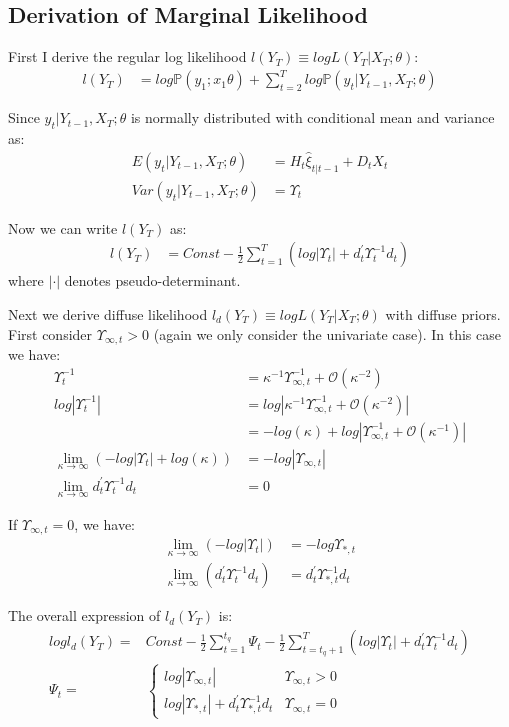 \documentclass[10pt]{article}
\numberwithin{equation}{section}
\begin{document}
\subsection{Derivation of Marginal Likelihood} \label{ap:NL}
First I derive the regular log likelihood $l(Y_T)\equiv logL(Y_T|X_T;\theta)$: 
\begin{align*}
    l(Y_T) &= log\mathbb{P}(y_1;x_1\theta) + \sum_{t=2}^Tlog\mathbb{P}(y_t|Y_{t-1},X_T;\theta)
\end{align*}

Since $y_t|Y_{t-1},X_T;\theta$ is normally distributed with conditional mean and variance as:
\begin{align*}
    E(y_t|Y_{t-1},X_T;\theta) &= H_t\hat{\xi}_{t|t-1} + D_tX_t \\
    Var(y_t|Y_{t-1},X_T;\theta) &= \Upsilon_t
\end{align*}

Now we can write $l(Y_T)$ as:
\begin{align*}
    l(Y_T) &= Const - \frac{1}{2}\sum_{t=1}^T(log|\Upsilon_t| + d_t^{'}\Upsilon_t^{-1}d_t)
\end{align*}
where $|\cdot|$ denotes pseudo-determinant.

Next we derive diffuse likelihood $l_d(Y_T)\equiv logL(Y_T|X_T;\theta)$ with diffuse priors. First consider $\Upsilon_{\infty,t}>0$ (again we only consider the univariate case). In this case we have:
\begin{align*}
    \Upsilon_t^{-1} &= \kappa^{-1}\Upsilon_{\infty,t}^{-1}+\mathcal{O}(\kappa^{-2}) \\
    log|\Upsilon_t^{-1}| &= log|\kappa^{-1}\Upsilon_{\infty,t}^{-1}+\mathcal{O}(\kappa^{-2})| \\
    &=-log(\kappa) + log|\Upsilon_{\infty,t}^{-1}+\mathcal{O}(\kappa^{-1})| \\
    \lim_{\kappa\rightarrow \infty}(-log|\Upsilon_t| + log(\kappa)) &= -log|\Upsilon_{\infty,t}| \\
    \lim_{\kappa\rightarrow \infty}d_t^{'}\Upsilon_t^{-1}d_t &= 0
\end{align*}

If $\Upsilon_{\infty,t}=0$, we have:
\begin{align*}
    \lim_{\kappa\rightarrow \infty}(-log|\Upsilon_t|) &= -log{\Upsilon_{*,t}} \\
    \lim_{\kappa\rightarrow \infty}(d_t^{'}\Upsilon_t^{-1}d_t) &= d_t^{'}\Upsilon_{*,t}^{-1}d_t
\end{align*}

The overall expression of $l_d(Y_T)$ is:
\begin{align*}
    logl_d(Y_T) =& Const - \frac{1}{2}\sum_{t=1}^{t_q}\Psi_t - \frac{1}{2}\sum_{t=t_q+1}^{T}(log|\Upsilon_t| + d_t^{'}\Upsilon_t^{-1}d_t) \nonumber \\
    \Psi_t =& \begin{cases}
        log|\Upsilon_{\infty,t}| & \Upsilon_{\infty,t} > 0 \\
        log|\Upsilon_{*,t}| + d_t^{'}\Upsilon_{*,t}^{-1}d_t & \Upsilon_{\infty,t}=0
    \end{cases} \nonumber
\end{align*}
\end{document}
